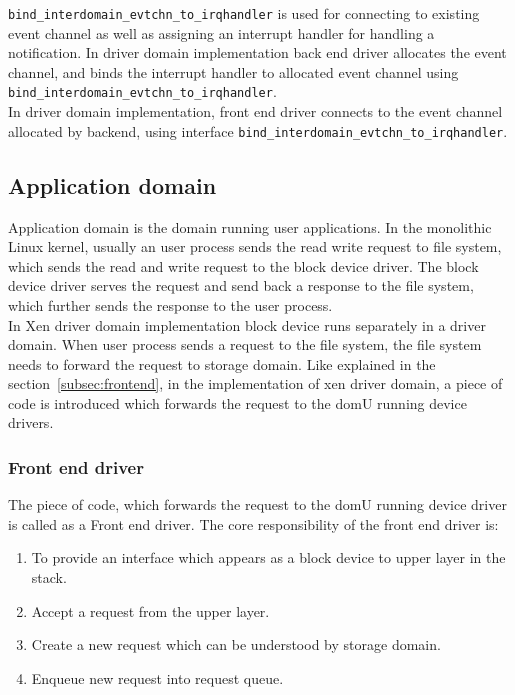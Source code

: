 
\texttt{bind\_interdomain\_evtchn\_to\_irqhandler} is used for connecting to existing event channel as well as assigning an interrupt handler for handling a notification. In driver domain implementation back end driver allocates the event channel, and binds the interrupt handler to allocated event channel using \texttt{bind\_interdomain\_evtchn\_to\_irqhandler}.
\\
In driver domain implementation, front end driver connects to the event channel allocated by backend, using interface \texttt{bind\_interdomain\_evtchn\_to\_irqhandler}.


\subsection{Application domain}
Application domain is the domain running user applications. In the monolithic Linux kernel, usually an user process sends the read write request to file system, which sends the read and write request to the block device driver. The block device driver serves the request and send back a response to the file system, which further sends the response to the user process. 
\\ 
In Xen driver domain implementation block device runs separately in a driver domain. When user process sends a request to the file system, the file system needs to forward the request to storage domain. Like explained in the section~\ref{subsec:frontend}, in the implementation of xen driver domain, a piece of code is introduced which forwards the request to the domU running device drivers. 

\subsubsection*{Front end driver}

The piece of code, which forwards the request to the domU running device driver is called as a Front end driver. The core responsibility of the front end driver is:
\begin{enumerate}
\item To provide an interface which appears as a block device to upper layer in the stack.
\item Accept a request from the upper layer.
\item Create a new request which can be understood by storage domain.
\item Enqueue new request into request queue.
\end{enumerate}

